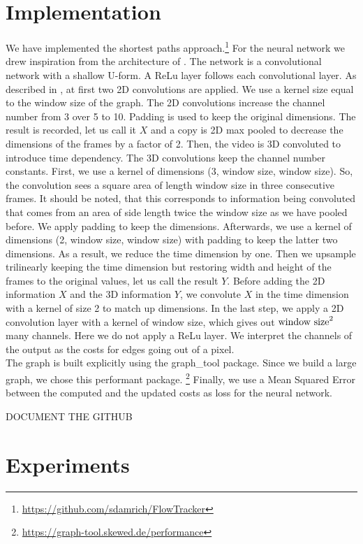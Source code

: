 \documentclass{article}
\begin{document}
{\section{Implementation}
We have implemented the shortest paths approach.\footnote{\url{https://github.com/sdamrich/FlowTracker}}  For the neural network we drew inspiration from the architecture of \cite{Lee17}. The network is a convolutional network with a shallow U-form. A ReLu layer follows each convolutional layer. As described in \cite{Lee17}, at first two 2D convolutions are applied. We use a kernel size equal to the window size of the graph. The 2D convolutions increase the channel number from 3 over 5 to 10. Padding is used to keep the original dimensions. The result is recorded, let us call it $X$ and a copy is 2D max pooled to decrease the dimensions of the frames by a factor of 2. Then, the video is 3D convoluted to introduce time dependency. The 3D convolutions keep the channel number constants.  First, we use a kernel of dimensions (3, window size, window size). So, the convolution sees a square area of length window size in three consecutive frames. It should be noted, that this corresponds to information being convoluted that comes from an area of side length twice the window size as we have pooled before. We apply padding to keep the dimensions. Afterwards, we use a kernel of dimensions (2, window size, window size) with padding to keep the latter two dimensions. As a result, we reduce the time dimension by one. Then we upsample trilinearly keeping the time dimension but restoring width and height of the frames to the original values, let us call the result $Y$. Before adding the 2D information $X$ and the 3D information $Y$, we convolute $X$ in the time dimension with a kernel of size 2 to match up dimensions. 
In the last step, we apply a 2D convolution layer with a kernel of window size, which gives out $\textnormal{window size}^2$ many channels. Here we do not apply a ReLu layer. We interpret the channels of the output as the costs for edges going out of a pixel.\\ 
The graph is built explicitly using the 
graph\_tool package. Since we build a large graph, we chose this performant package. \footnote{\url{https://graph-tool.skewed.de/performance}} Finally, we use a Mean Squared Error between the computed and the updated costs as loss for the neural network.

DOCUMENT THE GITHUB

\section{Experiments}
}
\end{document}
